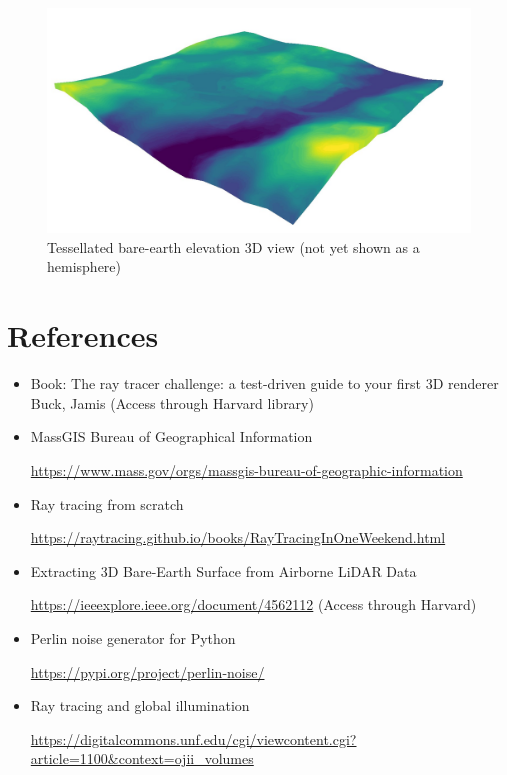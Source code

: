 \documentclass{article}
\begin{document}
\begin{figure}[H]
      \caption{Tessellated bare-earth elevation 3D view (not yet shown as a hemisphere)}
      \begin{center}
            \includegraphics[width=4.5in]{terrain.jpg}
      \end{center}
\end{figure}

\section{References}

\begin{itemize}
      \item Book: The ray tracer challenge: a test-driven guide to your first 3D renderer Buck, Jamis (Access through Harvard library)

      \item MassGIS Bureau of Geographical Information

            \url{https://www.mass.gov/orgs/massgis-bureau-of-geographic-information}
      \item Ray tracing from scratch

            \url{https://raytracing.github.io/books/RayTracingInOneWeekend.html}
      \item Extracting 3D Bare-Earth Surface from Airborne LiDAR Data

            \url{https://ieeexplore.ieee.org/document/4562112} (Access through Harvard)
      \item Perlin noise generator for Python

            \url{https://pypi.org/project/perlin-noise/}
      \item Ray tracing and global illumination

            \url{https://digitalcommons.unf.edu/cgi/viewcontent.cgi?article=1100&context=ojii_volumes}

\end{itemize}
\end{document}
